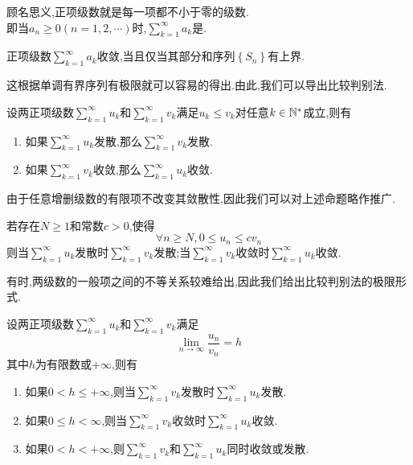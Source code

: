 \documentclass{ctexart}
\begin{document}
\pagestyle{empty}
\begin{center}\large{}\end{center}
\begin{definition}[1.1 定义:正项级数]
    顾名思义,正项级数就是每一项都不小于零的级数.\\
    即当$a_n\geqslant0(n=1,2,\cdots)$时,$\displaystyle\sum_{k=1}^{\infty}a_k$是.
\end{definition}
\noindent{}
\begin{formal}[2.1 正项级数收敛当且仅当有上界]
    正项级数$\displaystyle\sum_{k=1}^\infty a_k$收敛,当且仅当其部分和序列$\left\{S_n\right\}$有上界.
\end{formal}\noindent
这根据单调有界序列有极限就可以容易的得出.由此,我们可以导出比较判别法.
\begin{formal}[2.2 比较判别法I]
    设两正项级数$\displaystyle\sum_{k=1}^\infty u_k$和$\displaystyle\sum_{k=1}^\infty v_k$满足$u_k\leqslant v_k$对任意$k\in\mathbb{N}^*$成立,则有
    \begin{enumerate}[label=\tbf{\arabic*.}]
        \item 如果$\displaystyle\sum_{k=1}^\infty u_k$发散,那么$\displaystyle\sum_{k=1}^\infty v_k$发散.
        \item 如果$\displaystyle\sum_{k=1}^\infty v_k$收敛,那么$\displaystyle\sum_{k=1}^\infty u_k$收敛.
    \end{enumerate}
\end{formal}\noindent
由于任意增删级数的有限项不改变其敛散性,因此我们可以对上述命题略作推广.
\begin{formal}[2.2 比较判别法II]
    若存在$N\geqslant1$和常数$c>0$,使得
    \[\forall n\geqslant N,0\leqslant u_n\leqslant cv_n\]
    则当$\displaystyle\sum_{k=1}^\infty u_k$发散时$\displaystyle\sum_{k=1}^\infty v_k$发散;当$\displaystyle\sum_{k=1}^\infty v_k$收敛时$\displaystyle\sum_{k=1}^\infty u_k$收敛.
\end{formal}\noindent
有时,两级数的一般项之间的不等关系较难给出,因此我们给出比较判别法的极限形式.
\begin{formal}[2.3 比较判别法III]
    设两正项级数$\displaystyle\sum_{k=1}^\infty u_k$和$\displaystyle\sum_{k=1}^\infty v_k$满足
    \[\lim_{n\to\infty}\dfrac{u_n}{v_n}=h\]
    其中$h$为有限数或$+\infty$,则有
    \begin{enumerate}[label=\tbf{\arabic*.}]
        \item 如果$0<h\leqslant+\infty$,则当$\displaystyle\sum_{k=1}^\infty v_k$发散时$\displaystyle\sum_{k=1}^\infty u_k$发散.
        \item 如果$0\leqslant h<\infty$,则当$\displaystyle\sum_{k=1}^\infty v_k$收敛时$\displaystyle\sum_{k=1}^\infty u_k$收敛.
        \item 如果$0<h<+\infty$,则$\displaystyle\sum_{k=1}^\infty v_k$和$\displaystyle\sum_{k=1}^\infty u_k$同时收敛或发散.
    \end{enumerate}
\end{formal}
\end{document}
